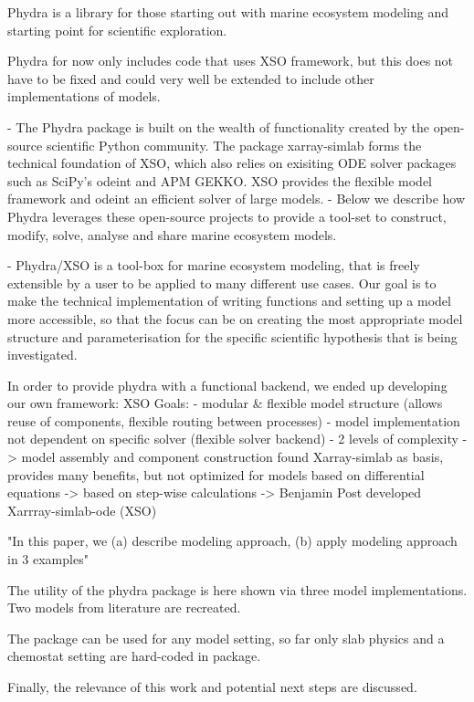 \documentclass[journal abbreviation, manuscript]{copernicus}
\begin{document}
Phydra is a library for those starting out with marine ecosystem modeling and starting point for scientific exploration.

Phydra for now only includes code that uses XSO framework, but this does not have to be fixed and could very well be extended to include other implementations of models.

- The Phydra package is built on the wealth of functionality created by the open-source scientific Python community. The package xarray-simlab forms the technical foundation of XSO, which also relies on exisiting ODE solver packages such as SciPy's odeint and APM GEKKO. XSO provides the flexible model framework and odeint an efficient solver of large models. 
- Below we describe how Phydra leverages these open-source projects to provide a tool-set to construct, modify, solve, analyse and share marine ecosystem models. 

- Phydra/XSO is a tool-box for marine ecosystem modeling, that is freely extensible by a user to be applied to many different use cases. Our goal is to make the technical implementation of writing functions and setting up a model more accessible, so that the focus can be on creating the most appropriate model structure and parameterisation for the specific scientific hypothesis that is being investigated. 

In order to provide phydra with a functional backend, we ended up developing our own framework: XSO
Goals:
- modular \& flexible model structure (allows reuse of components, flexible routing between processes)
- model implementation not dependent on specific solver (flexible solver backend)
- 2 levels of complexity -> model assembly and component construction
found Xarray-simlab as basis, provides many benefits, but not optimized for models based on differential equations -> based on step-wise calculations
-> Benjamin Post developed Xarrray-simlab-ode (XSO) 


"In this paper, we (a) describe modeling approach, (b) apply modeling approach in 3 examples"

The utility of the phydra package is here shown via three model implementations. Two models from literature are recreated.

The package can be used for any model setting, so far only slab physics and a chemostat setting are hard-coded in package.

Finally, the relevance of this work and potential next steps are discussed.
\end{document}
